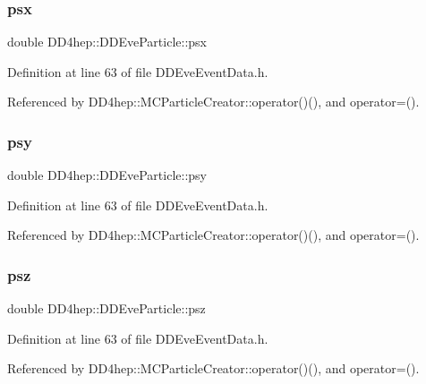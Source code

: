 \subsubsection{\texorpdfstring{psx}{psx}}
{\footnotesize\ttfamily double D\+D4hep\+::\+D\+D\+Eve\+Particle\+::psx}



Definition at line 63 of file D\+D\+Eve\+Event\+Data.\+h.



Referenced by D\+D4hep\+::\+M\+C\+Particle\+Creator\+::operator()(), and operator=().

\hypertarget{class_d_d4hep_1_1_d_d_eve_particle_a5e678bef386cffdab92eaebca644cdd1}{}\label{class_d_d4hep_1_1_d_d_eve_particle_a5e678bef386cffdab92eaebca644cdd1} 
\subsubsection{\texorpdfstring{psy}{psy}}
{\footnotesize\ttfamily double D\+D4hep\+::\+D\+D\+Eve\+Particle\+::psy}



Definition at line 63 of file D\+D\+Eve\+Event\+Data.\+h.



Referenced by D\+D4hep\+::\+M\+C\+Particle\+Creator\+::operator()(), and operator=().

\hypertarget{class_d_d4hep_1_1_d_d_eve_particle_ac1ff170f07e4abcecc63bf1c31294de4}{}\label{class_d_d4hep_1_1_d_d_eve_particle_ac1ff170f07e4abcecc63bf1c31294de4} 
\subsubsection{\texorpdfstring{psz}{psz}}
{\footnotesize\ttfamily double D\+D4hep\+::\+D\+D\+Eve\+Particle\+::psz}



Definition at line 63 of file D\+D\+Eve\+Event\+Data.\+h.



Referenced by D\+D4hep\+::\+M\+C\+Particle\+Creator\+::operator()(), and operator=().

\hypertarget{class_d_d4hep_1_1_d_d_eve_particle_ad15d69211063590b587d7ba6ff0d8726}{}\label{class_d_d4hep_1_1_d_d_eve_particle_ad15d69211063590b587d7ba6ff0d8726} 
